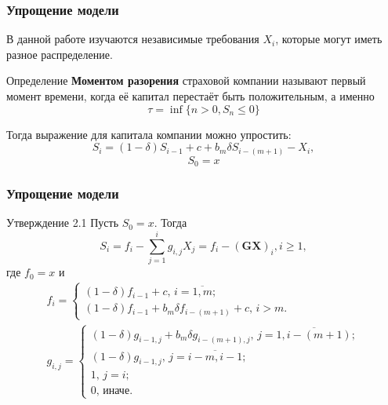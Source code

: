 \documentclass[10pt]{beamer}
\theoremstyle{definition}
\theoremstyle{remark}
\begin{document}
\begin{frame}\frametitle{Упрощение модели}
	 В данной работе изучаются независимые требования $X_i$, которые могут иметь разное распределение. \pause 
	 \begin{block}{Определение}
	 	\textbf{Моментом разорения} страховой компании называют первый момент времени, когда её капитал перестаёт быть положительным, а именно
	 	$$\tau = \inf \lbrace n > 0, S_n \leqslant 0 \rbrace$$
	 \end{block}\pause
	 Тогда выражение для капитала компании можно упростить:
	 $$S_i=(1-\delta)S_{i-1} + c + b_m \delta S_{i-(m+1)} - X_i,$$ $$S_0 = x$$
\end{frame}

\begin{frame}\frametitle{Упрощение модели}
	\begin{block}{Утверждение 2.1}
		Пусть $S_0 = x$. Тогда
		\begin{equation}\label{bas_s}
			S_i = f_i - \sum_{j=1}^i g_{i,j} X_j = f_i - (\mathbf{GX})_i, i \geqslant 1, 
		\end{equation}
		где $f_0 = x$ и 
		\begin{eqnarray*}
		f_i=
		\begin{cases} 
			(1-\delta)f_{i-1} + c,\, i = \overline{1, m};\\ 
			(1-\delta)f_{i-1} + b_m \delta f_{i-(m+1)} + c,\, i>m.				
		\end{cases}\\
		g_{i,j}=
		\begin{cases} 
			(1-\delta)g_{i-1,j} + b_m \delta g_{i-(m+1),j},\, j = \overline{1, i-(m+1)};\\ 
			(1-\delta)g_{i-1,j},\, j = \overline{i-m, i-1};\\ 
			1,\, j = i; \\
			0,\, \textit{иначе}.
		\end{cases}
		\end{eqnarray*}
	\end{block}
\end{frame}
\end{document}
